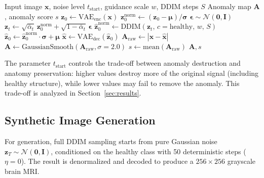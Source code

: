 \documentclass[graybox]{svmult}
\begin{document}
\begin{algorithm}[t]
\caption{Diffusion-Based Anomaly Detection}
\label{alg:anomaly}
\begin{algorithmic}[1]
\REQUIRE Input image $\mathbf{x}$, noise level $t_{\text{start}}$, guidance scale $w$, DDIM steps $S$
\ENSURE Anomaly map $\mathbf{A}$, anomaly score $s$
\STATE $\mathbf{z}_0 \leftarrow \text{VAE}_{\text{enc}}(\mathbf{x})$ 
\STATE $\mathbf{z}_0^{\text{norm}} \leftarrow (\mathbf{z}_0 - \boldsymbol{\mu}) / \boldsymbol{\sigma}$ 
\STATE $\boldsymbol{\epsilon} \sim \mathcal{N}(\mathbf{0}, \mathbf{I})$
\STATE $\mathbf{z}_{t} \leftarrow \sqrt{\bar{\alpha}_{t}} \, \mathbf{z}_0^{\text{norm}} + \sqrt{1 - \bar{\alpha}_{t}} \, \boldsymbol{\epsilon}$ 
\STATE $\hat{\mathbf{z}}_0^{\text{norm}} \leftarrow \text{DDIM}(\mathbf{z}_{t},\, c{=}\text{healthy},\, w,\, S)$ 
\STATE $\hat{\mathbf{z}}_0 \leftarrow \hat{\mathbf{z}}_0^{\text{norm}} \cdot \boldsymbol{\sigma} + \boldsymbol{\mu}$ 
\STATE $\hat{\mathbf{x}} \leftarrow \text{VAE}_{\text{dec}}(\hat{\mathbf{z}}_0)$ 
\STATE $\mathbf{A}_{\text{raw}} \leftarrow |\mathbf{x} - \hat{\mathbf{x}}|$
\STATE $\mathbf{A} \leftarrow \text{GaussianSmooth}(\mathbf{A}_{\text{raw}}, \sigma{=}2.0)$
\STATE $s \leftarrow \text{mean}(\mathbf{A}_{\text{raw}})$ 
\RETURN $\mathbf{A}, s$
\end{algorithmic}
\end{algorithm}

The parameter $t_{\text{start}}$ controls the trade-off between anomaly destruction and anatomy preservation: higher values destroy more of the original signal (including healthy structure), while lower values may fail to remove the anomaly. This trade-off is analyzed in Section~\ref{sec:results}.

\subsection{Synthetic Image Generation}
\label{sec:generation}

For generation, full DDIM sampling starts from pure Gaussian noise $\mathbf{z}_T \sim \mathcal{N}(\mathbf{0}, \mathbf{I})$, conditioned on the healthy class with 50 deterministic steps ($\eta = 0$). The result is denormalized and decoded to produce a $256 \times 256$ grayscale brain MRI.

\end{document}
